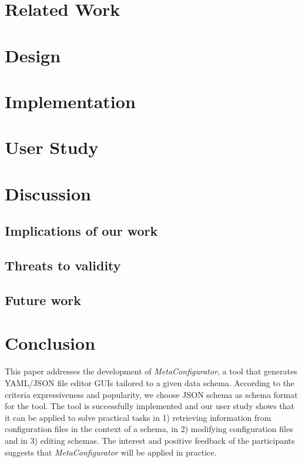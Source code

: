 \documentclass[lettersize,journal]{IEEEtran}
\newcommand{\cfgfiles}{configuration files}
\newcommand{\toolname}{\textit{MetaConfigurator}} %
\begin{document}
 \section{Related Work}\label{sec:research}
 


 \section{Design}\label{sec:design}
 


 \section{Implementation}\label{sec:implementation}
 

 \section{User Study}\label{sec:user_study}
 


 \section{Discussion}\label{sec:discussion} %
 
 \subsection{Implications of our work}
 
 
 \subsection{Threats to validity}
 
 
 \subsection{Future work}
 
 

 \section{Conclusion}\label{sec:conclusion} %
 
 This paper addresses the development of \toolname{}, a tool that generates YAML/JSON file editor GUIs tailored to a given data schema. 
According to the criteria expressiveness and popularity, we choose JSON schema as schema format for the tool.
The tool is successfully implemented and our user study shows that it can be applied to solve practical tasks in 1) retrieving information from \cfgfiles{} in the context of a schema, in 2) modifying \cfgfiles{} and in 3) editing schemas.
The interest and positive feedback of the participants suggests that \toolname{} will be applied in practice.
\end{document}
